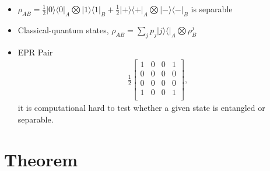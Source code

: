 \documentclass[../../note.tex]{subfiles}
\begin{document}
\begin{example}
    \begin{itemize}
        \item $\rho_{AB} = \frac{1}{2} \vert 0 \rangle \langle 0 \vert_A \bigotimes \vert 1 \rangle \langle 1 \vert_B + \frac{1}{2} \vert +  \rangle \langle + \vert_A \bigotimes \vert - \rangle \langle - \vert_B$ is separable
        \item Classical-quantum states, $\rho_{AB} = \sum_j p_j \vert j \rangle \langle \vert_A \bigotimes \rho_B^j$
        \item EPR Pair 
        \begin{align}
            \frac{1}{2}\left[\begin{matrix}
                1&0&0&1 \\
                0&0&0&0 \\
                0&0&0&0 \\
                1&0&0&1 \\
            \end{matrix}\right],
        \end{align}
        it is computational hard to test whether a given state is entangled or separable.
    \end{itemize}
\end{example}

\section{Theorem}
\end{document}
